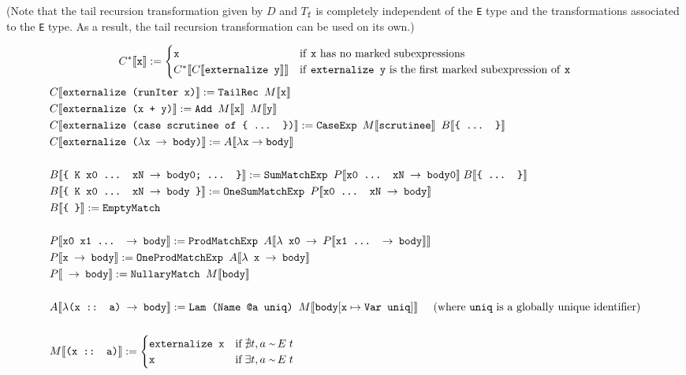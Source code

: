 \documentclass[sigplan,screen]{acmart}
\newcommand{\expr}[1]{\llbracket#1\rrbracket} %
\newcommand{\rarr}{\rightarrow}
\newcommand{\typeeq}{\raise.17ex\hbox{$\scriptstyle\mathtt{\sim}$}\,}
\newcommand{\ttt}{\texttt}
\begin{document}
(Note that the tail recursion transformation given by $D$ and $T_{\ttt{f}}$ is completely independent of the \ttt{E} type and the transformations associated to the \ttt{E} type. As a result, the tail recursion transformation can be used on its own.)

\begin{align*}
  &C^{*}\expr{\ttt{x}} :=
    \begin{cases}
      \ttt{x} & \text{if \ttt{x} has no marked subexpressions}\\
      C^{*}\expr{C\expr{\ttt{externalize y}}} & \text{if \ttt{externalize y} is the first marked subexpression of \ttt{x}}\\
    \end{cases}\\
\end{align*}
\begin{align*}
  &C\expr{\ttt{externalize (runIter x)}} := \ttt{TailRec $M\expr{\ttt{x}}$}\\
  &C\expr{\ttt{externalize (x + y)}} := \ttt{Add $M\expr{\ttt{x}}$ $M\expr{\ttt{y}}$}\\
  &C\expr{\ttt{externalize (case scrutinee of \{ ... \})}} := \ttt{CaseExp $M\expr{\ttt{scrutinee}}$ } B\expr{\ttt{\{ ... \}}}\\
  &C\expr{\ttt{externalize ($\lambda$x $\rarr$ body)}} := A\expr{\lambda \ttt{x} \rarr \ttt{body}}\\
  &\\
  &B\expr{\ttt{\{ K x0 ... xN $\rarr$ body0; ... \}}} := \ttt{SumMatchExp }P\expr{\ttt{x0 ... xN $\rarr$ body0}}\; B\expr{\ttt{\{ ... \}}}\\
  &B\expr{\ttt{\{ K x0 ... xN $\rarr$ body \}}} := \ttt{OneSumMatchExp }P\expr{\ttt{x0 ... xN $\rarr$ body}}\\
  &B\expr{\ttt{\{ \}}} := \ttt{EmptyMatch}\\
  &\\
  &P\expr{\ttt{x0 x1 ... $\rarr$ body}} := \ttt{ProdMatchExp }A\expr{\ttt{$\lambda$ x0 $\rarr$ $P\expr{\ttt{x1 ... $\rarr$ body}}$}}\\
  &P\expr{\ttt{x $\rarr$ body}} := \ttt{OneProdMatchExp }A\expr{\ttt{$\lambda$ x $\rarr$ body}}\\
  &P\expr{\ttt{ $\rarr$ body}} := \ttt{NullaryMatch $M\expr{\ttt{body}}$}\\
  &\\
  &A\expr{\ttt{$\lambda$(x :: a) $\rarr$ body}} := \ttt{Lam (Name @a uniq) $M\expr{\ttt{body$[\ttt{x} \mapsto \ttt{Var uniq}]$}}$}\text{\;\;\;\;\;(where \ttt{uniq} is a globally unique identifier)}\\
  &\\
  &M\expr{\ttt{(x :: a)}} :=
    \begin{cases}
      \ttt{externalize x} & \text{if}\; \nexists t, a\; \typeeq E\; t\\
      \ttt{x} & \text{if}\; \exists t, a\; \typeeq E\; t
    \end{cases}
\end{align*}
\end{document}
